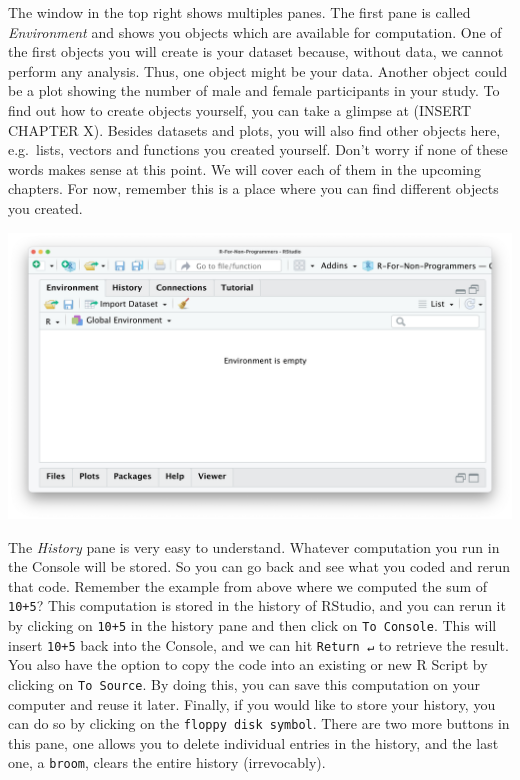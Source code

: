 \documentclass[
]{book}
\begin{document}
The window in the top right shows multiples panes. The first pane is called \emph{Environment} and shows you objects which are available for computation. One of the first objects you will create is your dataset because, without data, we cannot perform any analysis. Thus, one object might be your data. Another object could be a plot showing the number of male and female participants in your study. To find out how to create objects yourself, you can take a glimpse at (INSERT CHAPTER X). Besides datasets and plots, you will also find other objects here, e.g.~lists, vectors and functions you created yourself. Don't worry if none of these words makes sense at this point. We will cover each of them in the upcoming chapters. For now, remember this is a place where you can find different objects you created.

\includegraphics{images/chapter_04_img/04_environment_history_etc/01_rstudio_environment.png}

The \emph{History} pane is very easy to understand. Whatever computation you run in the Console will be stored. So you can go back and see what you coded and rerun that code. Remember the example from above where we computed the sum of \texttt{10+5}? This computation is stored in the history of RStudio, and you can rerun it by clicking on \texttt{10+5} in the history pane and then click on \texttt{To\ Console}. This will insert \texttt{10+5} back into the Console, and we can hit \texttt{Return\ ↵} to retrieve the result. You also have the option to copy the code into an existing or new R Script by clicking on \texttt{To\ Source}. By doing this, you can save this computation on your computer and reuse it later. Finally, if you would like to store your history, you can do so by clicking on the \texttt{floppy\ disk\ symbol}. There are two more buttons in this pane, one allows you to delete individual entries in the history, and the last one, a \texttt{broom}, clears the entire history (irrevocably).
\end{document}
